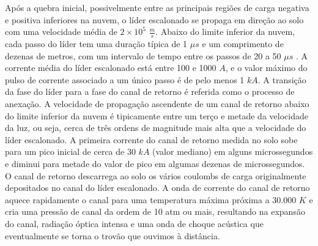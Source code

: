 \documentclass[a4paper, 12pt, onecolumn,singlespacing]{article}
\begin{document}
	Após a quebra inicial, possivelmente entre as principais regiões de carga negativa e positiva inferiores na nuvem, o líder escalonado se propaga em direção ao solo com uma velocidade média de $2 \times 10^{5}$ $\frac{m}{s}$. Abaixo do limite inferior da nuvem, cada passo do líder tem uma duração típica de 1 $\mu s$ e um comprimento de dezenas de metros, com um intervalo de tempo entre os passos de 20 a 50 $\mu s$ . A corrente média do líder escalonado está entre 100 e 1000 $A$, e o valor máximo do pulso de corrente associado a um único passo é de pelo menos 1 $kA$. A transição da fase do líder para a fase do canal de retorno é referida como o processo de anexação. A velocidade de propagação ascendente de um canal de retorno abaixo do limite inferior da nuvem é tipicamente entre um terço e metade da velocidade da luz, ou seja, cerca de três ordens de magnitude mais alta que a velocidade do líder escalonado. A primeira corrente do canal de retorno medida no solo sobe para um pico inicial de cerca de 30 $kA$ (valor mediano) em alguns microssegundos e diminui para metade do valor de pico em algumas dezenas de microssegundos. O canal de retorno descarrega ao solo os vários coulombs de carga originalmente depositados no canal do líder escalonado. A onda de corrente do canal de retorno aquece rapidamente o canal para uma temperatura máxima próxima a 30.000 $K$ e cria uma pressão de canal da ordem de 10 atm ou mais, resultando na expansão do canal, radiação óptica intensa e uma onda de choque acústica que eventualmente se torna o trovão que ouvimos à distância\cite{RAKOV_UHMAN}.
	
\end{document}
